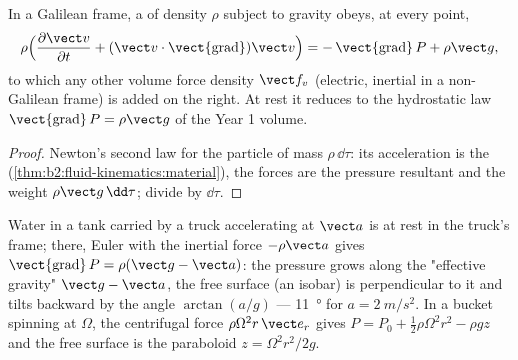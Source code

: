 \begin{theorem}\label{thm:b2:euler-bernoulli:euler}
In a Galilean frame, a  of density $\rho$ subject to
gravity obeys, at every point,
\[
\rho\Bigl(\frac{\partial\vect v}{\partial t} + (\vect v\cdot\operatorname{\vect{grad}})
\vect v\Bigr) = -\operatorname{\vect{grad}}P + \rho\vect g ,
\]
to which any other volume force density $\vect f_v$ (electric, inertial
in a non-Galilean frame) is added on the right. At rest it reduces to
the hydrostatic law $\operatorname{\vect{grad}}P = \rho\vect g$ of the
Year 1 volume.
\end{theorem}

\begin{proof}
Newton's second law for the particle of mass $\rho\,\dd\tau$: its
acceleration is the 
(\cref{thm:b2:fluid-kinematics:material}), the forces are the pressure
resultant and the weight $\rho\vect g\,\dd\tau$; divide by $\dd\tau$.
\end{proof}

\begin{example}\label{ex:b2:euler-bernoulli:tank}
Water in a tank carried by a truck accelerating at $\vect a$ is at rest
in the truck's frame; there, Euler with the inertial force $-\rho\vect a$
gives $\operatorname{\vect{grad}}P = \rho(\vect g - \vect a)$: the pressure
grows along the "effective gravity" $\vect g - \vect a$, the free
surface (an isobar) is perpendicular to it and tilts backward by the
angle $\arctan(a/g)$ --- \qty{11}{\degree} for $a = \qty{2}{m/s^2}$. In a
bucket spinning at $\Omega$, the centrifugal force $\rho\Omega^2r\,\vect e_r$
gives $P = P_0 + \tfrac12\rho\Omega^2r^2 - \rho gz$ and the free surface is
the paraboloid $z = \Omega^2r^2/2g$.
\end{example}

